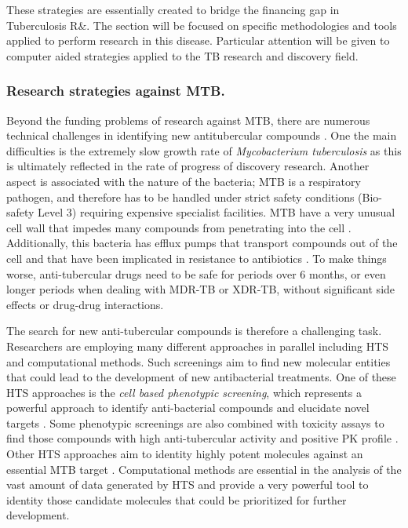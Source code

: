 \documentclass[12pt, b5paper,twoside]{tesi_upf}
\begin{document}
\par These strategies are essentially created to bridge the financing gap in Tuberculosis R$\&$. The section will be focused on specific methodologies and tools applied to perform research in this disease. Particular attention will be given to computer aided strategies applied to the TB research and discovery field. 

\subsubsection{Research strategies against MTB.}\label{mtb_research}

\par Beyond the funding problems of research against MTB, there are numerous technical challenges in identifying new antitubercular compounds \cite{Zuniga2015}. One the main difficulties is the extremely slow growth rate of \textit{Mycobacterium tuberculosis} as this is ultimately reflected in the rate of progress of discovery research. Another aspect is associated with the nature of the bacteria; MTB is a respiratory pathogen, and therefore has to be handled under strict safety conditions (Bio-safety Level 3) requiring expensive specialist facilities. MTB have a very unusual cell wall that impedes many compounds from penetrating into the cell \cite{Brennan2003}. Additionally, this bacteria has efflux pumps that transport compounds out of the cell and that have been implicated in resistance to antibiotics \cite{Rodrigues2012}. To make things worse, anti-tubercular drugs need to be safe for periods over 6 months, or even longer periods when dealing with MDR-TB or XDR-TB, without significant side effects or drug-drug interactions. 
\par The search for new anti-tubercular compounds is therefore a challenging task. Researchers are employing many different approaches in parallel including HTS and computational methods. Such screenings aim to find new molecular entities that could lead to the development of new antibacterial treatments. One of these HTS approaches is the \textit{cell based phenotypic screening}, which represents a powerful approach to identify anti-bacterial compounds and elucidate novel targets \cite{Manjunatha2015}. Some phenotypic screenings are also combined with toxicity assays to find those compounds with high anti-tubercular activity and positive PK profile \cite{Ballell2013}. Other HTS approaches aim to identity highly potent molecules against an essential MTB target \cite{Park2015, Arora2014}.  Computational methods are essential in the analysis of the vast amount of data generated by HTS and provide a very powerful tool to identity those candidate molecules that could be prioritized for further development. 
\end{document}
